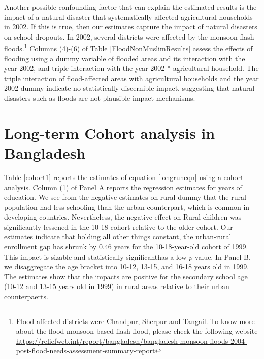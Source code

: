 \documentclass[12pt,letterpaper]{article}
\newcommand{\0}{\ensuremath{\mbox{\boldmath $0$}}}
\begin{document}
Another possible confounding factor that can explain the estimated results is the impact of a natural disaster that systematically affected agricultural households in 2002. If this is true, then our estimates capture the impact of natural disasters on school dropouts. In 2002, several districts were affected by the monsoon flash floods.\footnote{Flood-affected districts were Chandpur, Sherpur and Tangail. To know more about the flood monsoon based flash flood, please check the following website \url{https://reliefweb.int/report/bangladesh/bangladesh-monsoon-floods-2004-post-flood-needs-assessment-summary-report} } Columns (4)-(6) of Table \ref{FloodNonMuslimResults} assess the effects of flooding using a dummy variable of flooded areas and its interaction with the year 2002, and triple interaction with the year 2002 * agricultural household. The triple interaction of flood-affected areas with agricultural households and the year 2002 dummy indicate no statistically discernible impact, suggesting that natural disasters such as floods are not plausible impact mechanisms.


\section{Long-term Cohort analysis in Bangladesh\label{sec.long-term}}


Table \ref{cohort1} reports the estimates of equation \ref{longruneqn} using a cohort analysis. Column (1) of Panel A reports the regression estimates for years of education. We see from the negative estimates on rural dummy that the rural population had less schooling than the urban counterpart, which is common in developing countries. Nevertheless, the negative effect on Rural children was significantly lessened in the 10-18 cohort relative to the older cohort. Our estimates indicate that holding all other things constant, the urban-rural enrollment gap has shrunk by 0.46 years for the 10-18-year-old cohort of 1999. This impact is sizable and \sout{statistically significant}has a low $p$ value. In Panel B, we disaggregate the age bracket into 10-12, 13-15, and 16-18 years old in 1999. The estimates show that the impacts are positive for the secondary school age (10-12 and 13-15 years old in 1999) in rural areas relative to their urban counterpaerts. 
\end{document}
